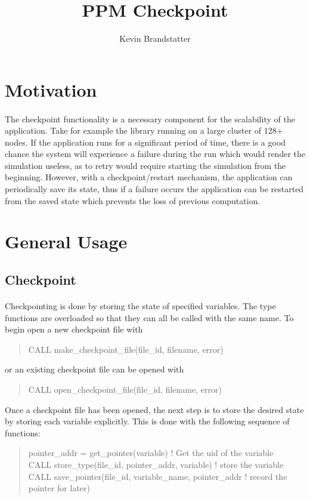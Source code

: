 \documentclass{article}
\title{PPM Checkpoint}
\author{Kevin Brandstatter}
\begin{document}
\maketitle
\section{Motivation}
\paragraph{}
The checkpoint functionality is a necessary component for the scalability of the application. Take for example the library running on a large cluster of 128+ nodes. If the application runs for a significant period of time, there is a good chance the system will experience a failure during the run which would render the simulation useless, as to retry would require starting the simulation from the beginning. However, with a checkpoint/restart mechanism, the application can periodically save its state, thus if a failure occurs the application can be restarted from the saved state which prevents the loss of previous computation.
\section{General Usage}
\subsection{Checkpoint}
\paragraph{}
Checkpointing is done by storing the state of specified variables. The type functions are overloaded so that they can all be called with the same name. To begin open a new checkpoint file with
\begin{quote}
CALL make\_checkpoint\_file(file\_id, filename, error)
\end{quote}
or an existing checkpoint file can be opened with
\begin{quote}
   CALL open\_checkpoint\_file(file\_id, filename, error)
\end{quote}

Once a checkpoint file has been opened, the next step is to store the desired state by storing each variable explicitly. This is done with the following sequence of functions:
\begin{quote}
   pointer\_addr = get\_pointer(variable) ! Get the uid of the variable \\
   CALL store\_type(file\_id, pointer\_addr, variable) ! store the variable \\
   CALL save\_pointer(file\_id, variable\_name, pointer\_addr ! record the pointer for later) \\
\end{quote}
\end{document}
